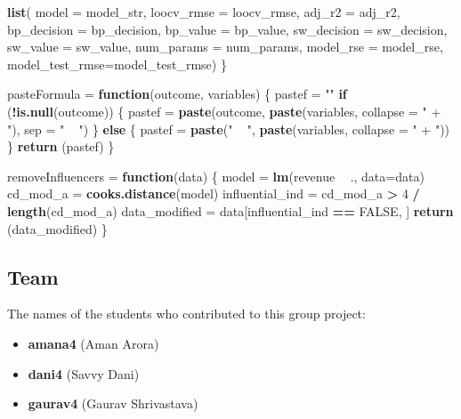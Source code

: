 \documentclass[
]{article}
\newenvironment{Shaded}{\begin{snugshade}}{\end{snugshade}}
\newcommand{\ControlFlowTok}[1]{\textcolor[rgb]{0.13,0.29,0.53}{\textbf{#1}}}
\newcommand{\DataTypeTok}[1]{\textcolor[rgb]{0.13,0.29,0.53}{#1}}
\newcommand{\DecValTok}[1]{\textcolor[rgb]{0.00,0.00,0.81}{#1}}
\newcommand{\KeywordTok}[1]{\textcolor[rgb]{0.13,0.29,0.53}{\textbf{#1}}}
\newcommand{\NormalTok}[1]{#1}
\newcommand{\OperatorTok}[1]{\textcolor[rgb]{0.81,0.36,0.00}{\textbf{#1}}}
\newcommand{\OtherTok}[1]{\textcolor[rgb]{0.56,0.35,0.01}{#1}}
\newcommand{\StringTok}[1]{\textcolor[rgb]{0.31,0.60,0.02}{#1}}
\providecommand{\tightlist}{%
  \setlength{\itemsep}{0pt}\setlength{\parskip}{0pt}}
\begin{document}
\begin{Shaded}
\begin{Highlighting}[]
  \KeywordTok{list}\NormalTok{(}
       \DataTypeTok{model =}\NormalTok{ model_str,}
       \DataTypeTok{loocv_rmse =}\NormalTok{ loocv_rmse,}
       \DataTypeTok{adj_r2 =}\NormalTok{ adj_r2,}
       \DataTypeTok{bp_decision =}\NormalTok{ bp_decision,}
       \DataTypeTok{bp_value =}\NormalTok{ bp_value,}
       \DataTypeTok{sw_decision =}\NormalTok{ sw_decision,}
       \DataTypeTok{sw_value =}\NormalTok{ sw_value,}
       \DataTypeTok{num_params =}\NormalTok{ num_params,}
       \DataTypeTok{model_rse =}\NormalTok{ model_rse,}
       \DataTypeTok{model_test_rmse=}\NormalTok{model_test_rmse)}
\NormalTok{\}}

\NormalTok{pasteFormula =}\StringTok{ }\ControlFlowTok{function}\NormalTok{(outcome, variables) \{}
\NormalTok{  pastef =}\StringTok{ ""}
  \ControlFlowTok{if}\NormalTok{ (}\OperatorTok{!}\KeywordTok{is.null}\NormalTok{(outcome)) \{}
\NormalTok{    pastef =}\StringTok{ }\KeywordTok{paste}\NormalTok{(outcome, }\KeywordTok{paste}\NormalTok{(variables, }\DataTypeTok{collapse =} \StringTok{" + "}\NormalTok{), }\DataTypeTok{sep =} \StringTok{" ~ "}\NormalTok{)}
\NormalTok{  \} }\ControlFlowTok{else}\NormalTok{ \{}
\NormalTok{    pastef =}\StringTok{ }\KeywordTok{paste}\NormalTok{(}\StringTok{" ~ "}\NormalTok{, }\KeywordTok{paste}\NormalTok{(variables, }\DataTypeTok{collapse =} \StringTok{" + "}\NormalTok{))}
\NormalTok{  \}}
  \KeywordTok{return}\NormalTok{ (pastef)}
\NormalTok{\}}

\NormalTok{removeInfluencers =}\StringTok{ }\ControlFlowTok{function}\NormalTok{(data) \{}
\NormalTok{  model =}\StringTok{ }\KeywordTok{lm}\NormalTok{(revenue }\OperatorTok{~}\StringTok{ }\NormalTok{., }\DataTypeTok{data=}\NormalTok{data)}
\NormalTok{  cd_mod_a =}\StringTok{ }\KeywordTok{cooks.distance}\NormalTok{(model)}
\NormalTok{  influential_ind =}\StringTok{ }\NormalTok{cd_mod_a }\OperatorTok{>}\StringTok{ }\DecValTok{4} \OperatorTok{/}\StringTok{ }\KeywordTok{length}\NormalTok{(cd_mod_a)}
\NormalTok{  data_modified =}\StringTok{ }\NormalTok{data[influential_ind }\OperatorTok{==}\StringTok{ }\OtherTok{FALSE}\NormalTok{, ]}
  \KeywordTok{return}\NormalTok{ (data_modified)}
\NormalTok{\}}
\end{Highlighting}
\end{Shaded}

\hypertarget{team}{%
\subsection{Team}\label{team}}

The names of the students who contributed to this group project:

\begin{itemize}
\tightlist
\item
  \textbf{amana4} (Aman Arora)
\item
  \textbf{dani4} (Savvy Dani)
\item
  \textbf{gaurav4} (Gaurav Shrivastava)
\end{itemize}
\end{document}
